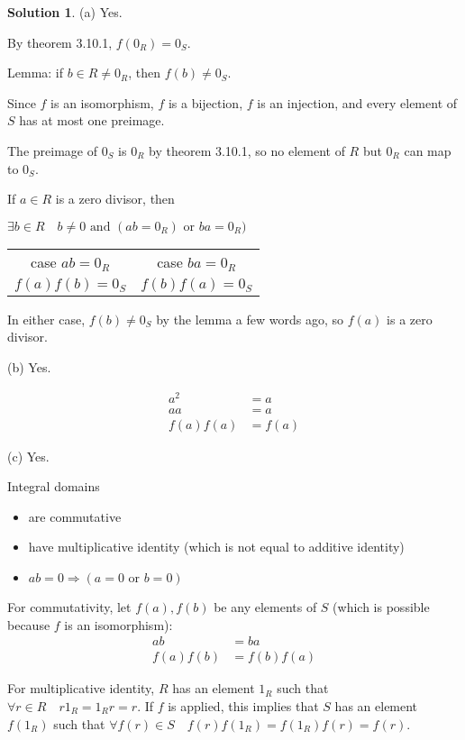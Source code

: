 \documentclass[12pt]{article}
\theoremstyle{definition}
\newtheorem*{soln}{Solution}
\begin{document}
\begin{soln}\quad

(a) Yes.

By theorem 3.10.1, $f(0_R)=0_S$.

Lemma: if $b\in R\neq 0_R$, then $f(b)\neq 0_S$.

\leftskip 2cm

Since $f$ is an isomorphism,
$f$ is a bijection,
$f$ is an injection,
and every element of $S$ has at most one preimage.

The preimage of $0_S$ is $0_R$ by theorem 3.10.1,
so no element of $R$ but $0_R$ can map to $0_S$.

\leftskip 0cm

If $a\in R$ is a zero divisor, then

\begin{center}
$\exists b\in R\quad b\neq 0\text{ and } (ab=0_R) \text{ or } ba=0_R)$

\begin{tabular}{c|c}
case $ab=0_R$ & case $ba=0_R$\\
$f(a)f(b)=0_S$ & $f(b)f(a)=0_S$
\end{tabular}
\end{center}

In either case, $f(b)\neq 0_S$ by the lemma a few words ago,
so $f(a)$ is a zero divisor.

(b) Yes.

\begin{align*}
a^2&=a\\
aa&=a\\
f(a)f(a)&=f(a)
\end{align*}

(c) Yes.

Integral domains

\begin{itemize}
\item are commutative
\item have multiplicative identity (which is not equal to additive identity)
\item $ab=0\Rightarrow (a=0\text{ or } b=0)$
\end{itemize}

For commutativity, let $f(a),f(b)$ be any elements of $S$
(which is possible because $f$ is an isomorphism):
\begin{align*}
ab&=ba\\
f(a)f(b)&=f(b)f(a)
\end{align*}

For multiplicative identity,
$R$ has an element $1_R$ such that $\forall r\in R\quad r1_R=1_Rr=r$.
If $f$ is applied, this implies that $S$ has an element $f(1_R)$
such that $\forall f(r)\in S\quad f(r)f(1_R)=f(1_R)f(r)=f(r)$.


\end{soln}
\end{document}
